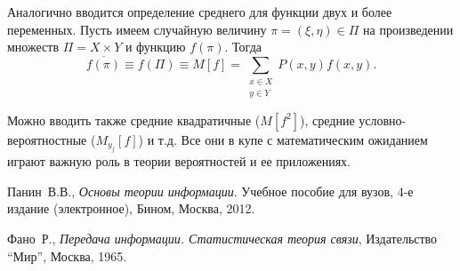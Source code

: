 \documentclass[12pt,a4paper,openright]{book}
\theoremstyle{definition}
\numberwithin{equation}{chapter}
\begin{document}
\begin{appendices}
		Аналогично вводится определение среднего для функции двух и более переменных. Пусть имеем случайную величину $\pi = (\xi, \eta) \in \varPi$ на произведении множеств $\varPi = X \times Y$ и функцию $f(\pi)$. Тогда
		\begin{equation}\label{f:avg}
			\overline{f(\pi)} \equiv f(\varPi) \equiv M[f] = \sum\limits_{\substack{x \in X \\ y \in Y}}{P(x, y)f(x, y)} \text{.}
		\end{equation}

		Можно вводить также средние квадратичные ($M[f^2]$), средние условно-вероятностные ($M_{y_j}[f]$) и т.д. Все они в купе с математическим ожиданием играют важную роль в теории вероятностей и ее приложениях.


	\end{appendices}



	\begin{thebibliography}{9}
		Панин~В.В.,
		\emph{Основы теории информации}. Учебное пособие для вузов,
		4-е издание (электронное),
		Бином, Москва,
		2012.

		Фано~Р.,
		\emph{Передача информации. Статистическая теория связи},
		Издательство ``Мир'', Москва,
		1965.
	\end{thebibliography}
\end{document}
